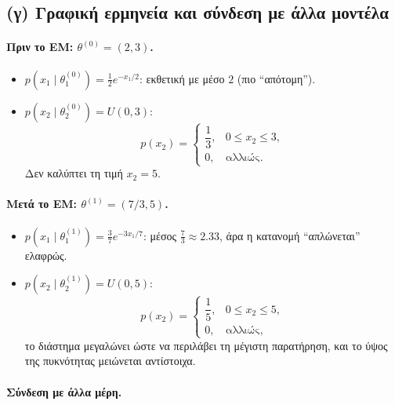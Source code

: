 \documentclass[a4paper,11pt]{article}
\begin{document}
\subsection{(γ) Γραφική ερμηνεία και σύνδεση με άλλα μοντέλα}

\paragraph{Πριν το EM: $\theta^{(0)}=(2,3)$.}

\begin{itemize}
  \item $p(x_1\mid \theta_1^{(0)}) = \frac{1}{2} e^{-x_1/2}$:
        εκθετική με μέσο $2$ (πιο ``απότομη'').
  \item $p(x_2\mid \theta_2^{(0)}) = U(0,3)$:
        \[
        p(x_2) =
        \begin{cases}
          \dfrac{1}{3}, & 0\le x_2\le 3,\\[4pt]
          0, & \text{αλλιώς.}
        \end{cases}
        \]
        Δεν καλύπτει τη τιμή $x_2=5$.
\end{itemize}

\paragraph{Μετά το EM: $\theta^{(1)}=(7/3,5)$.}

\begin{itemize}
  \item $p(x_1\mid \theta_1^{(1)}) = \frac{3}{7} e^{-3x_1/7}$:
        μέσος $\frac{7}{3} \approx 2.33$, άρα η κατανομή ``απλώνεται'' ελαφρώς.
  \item $p(x_2\mid \theta_2^{(1)}) = U(0,5)$:
        \[
        p(x_2) =
        \begin{cases}
          \dfrac{1}{5}, & 0\le x_2\le 5,\\[4pt]
          0, & \text{αλλιώς,}
        \end{cases}
        \]
        το διάστημα μεγαλώνει ώστε να περιλάβει τη μέγιστη παρατήρηση,
        και το ύψος της πυκνότητας μειώνεται αντίστοιχα.
\end{itemize}

\paragraph{Σύνδεση με άλλα μέρη.}
\end{document}
